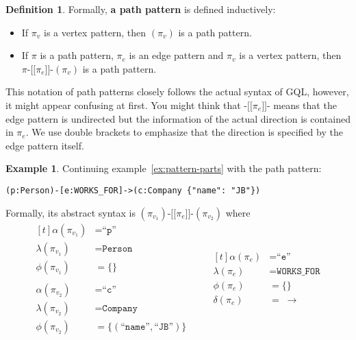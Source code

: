 \documentclass[14pt]{constructor-thesis}
\theoremstyle{definition}
\newtheorem{definition}{Definition}
\newtheorem{example}{Example}
\newcommand{\patternstart}[1]{(#1)}
\newcommand{\patternhop}[3]{#1 \texttt{-[[} #2 \texttt{]]-} (#3)}
\begin{document}

\begin{definition}
  Formally, \textbf{a path pattern} is defined inductively:
  \begin{itemize}
    \item If $\pi_v$ is a vertex pattern, then $\patternstart{\pi_v}$ is a path pattern.
    \item If $\pi$ is a path pattern, $\pi_e$ is an edge pattern and $\pi_v$ is a vertex pattern, then $\patternhop{\pi}{\pi_e}{\pi_v}$ is a path pattern.
  \end{itemize}
\end{definition}

This notation of path patterns closely follows the actual syntax of GQL, however, it might appear confusing at first. You might think that $\texttt{-[[} \pi_e \texttt{]]-}$ means that the edge pattern is undirected but the information of the actual direction is contained in $\pi_e$. We use double brackets to emphasize that the direction is specified by the edge pattern itself.

\begin{example}
  Continuing example~\ref{ex:pattern-parts} with the path pattern:

  \verb+(p:Person)-[e:WORKS_FOR]->(c:Company {"name": "JB"})+

  Formally, its abstract syntax is $\patternhop{\patternstart{\pi_{v_1}}}{\pi_e}{\pi_{v_2}}$ where
  \begin{equation*}
    \begin{aligned}[t]
      \alpha(\pi_{v_1}) &= \texttt{``p''} \\
      \lambda(\pi_{v_1}) &= \texttt{Person} \\
      \phi(\pi_{v_1}) &= \{ \} \\
      \\
      \alpha(\pi_{v_2}) &= \texttt{``c''} \\
      \lambda(\pi_{v_2}) &= \texttt{Company} \\
      \phi(\pi_{v_2}) &= \{ (\texttt{``name''}, \texttt{``JB''}) \} \\
    \end{aligned}
    \qquad
    \begin{aligned}[t]
      \alpha(\pi_e) &= \texttt{``e''} \\
      \lambda(\pi_e) &= \texttt{WORKS\_FOR} \\
      \phi(\pi_e) &= \{ \} \\
      \delta(\pi_e) &= \; \rightarrow \\
    \end{aligned}
  \end{equation*}
\end{example}
\end{document}
